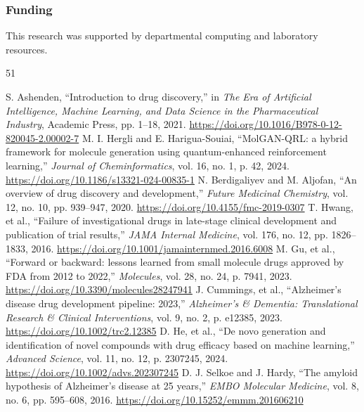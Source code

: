 \documentclass[10pt,a4paper]{article}
\begin{document}
\subsubsection*{Funding}
This research was supported by departmental computing and laboratory resources.

\begin{thebibliography}{51}
\footnotesize
\setlength{\itemsep}{0.1pt}
\setlength{\parskip}{0pt}

 S. Ashenden, ``Introduction to drug discovery,'' in \textit{The Era of Artificial Intelligence, Machine Learning, and Data Science in the Pharmaceutical Industry}, Academic Press, pp. 1--18, 2021. \url{https://doi.org/10.1016/B978-0-12-820045-2.00002-7}
 M. I. Hergli and E. Harigua-Souiai, ``MolGAN-QRL: a hybrid framework for molecule generation using quantum-enhanced reinforcement learning,'' \textit{Journal of Cheminformatics}, vol. 16, no. 1, p. 42, 2024. \url{https://doi.org/10.1186/s13321-024-00835-1}
 N. Berdigaliyev and M. Aljofan, ``An overview of drug discovery and development,'' \textit{Future Medicinal Chemistry}, vol. 12, no. 10, pp. 939--947, 2020. \url{https://doi.org/10.4155/fmc-2019-0307}
 T. Hwang, et al., ``Failure of investigational drugs in late-stage clinical development and publication of trial results,'' \textit{JAMA Internal Medicine}, vol. 176, no. 12, pp. 1826--1833, 2016. \url{https://doi.org/10.1001/jamainternmed.2016.6008}
 M. Gu, et al., ``Forward or backward: lessons learned from small molecule drugs approved by FDA from 2012 to 2022,'' \textit{Molecules}, vol. 28, no. 24, p. 7941, 2023. \url{https://doi.org/10.3390/molecules28247941}
 J. Cummings, et al., ``Alzheimer's disease drug development pipeline: 2023,'' \textit{Alzheimer's \& Dementia: Translational Research \& Clinical Interventions}, vol. 9, no. 2, p. e12385, 2023. \url{https://doi.org/10.1002/trc2.12385}
 D. He, et al., ``De novo generation and identification of novel compounds with drug efficacy based on machine learning,'' \textit{Advanced Science}, vol. 11, no. 12, p. 2307245, 2024. \url{https://doi.org/10.1002/advs.202307245}
 D. J. Selkoe and J. Hardy, ``The amyloid hypothesis of Alzheimer's disease at 25 years,'' \textit{EMBO Molecular Medicine}, vol. 8, no. 6, pp. 595--608, 2016. \url{https://doi.org/10.15252/emmm.201606210}

\end{thebibliography}
\end{document}
